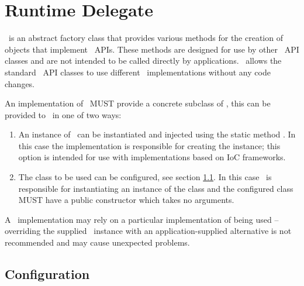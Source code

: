 \chapter{Runtime Delegate}

\rd\ is an abstract factory class that provides various methods for the creation of objects that implement \jaxrs\ APIs. These methods are designed for use by other \jaxrs\ API classes and are not intended to be called directly by applications. \rd\ allows the standard \jaxrs\ API classes to use different \jaxrs\ implementations without any code changes.

An implementation of \jaxrs\ MUST provide a concrete subclass of \rd, this can be provided to \jaxrs\ in one of two ways:

\begin{enumerate}
\item An instance of \rd\ can be instantiated and injected using the static method \rd{}. In this case the implementation is responsible for creating the instance; this option is intended for use with implementations based on IoC frameworks.
\item The class to be used can be configured, see section \ref{rdconfig}. In this case \jaxrs\ is responsible for instantiating an instance of the class and the configured class MUST have a public constructor which takes no arguments.
\end{enumerate}

A \jaxrs\ implementation may rely on a particular implementation of \rd being used -- overriding the supplied \rd\ instance with an application-supplied alternative is not recommended and may cause unexpected problems. 

\section{Configuration}\label{rdconfig}

